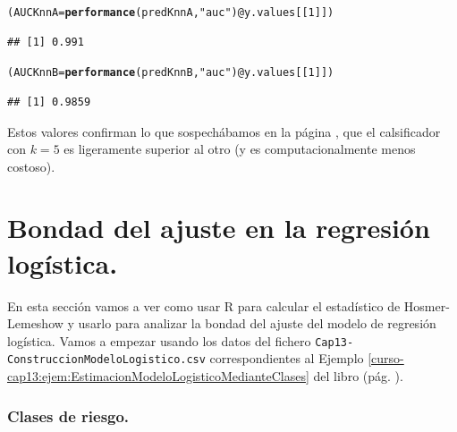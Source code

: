 \documentclass[10pt,a4paper]{article}\usepackage[]{graphicx}\usepackage[]{color}
\makeatletter
\newcommand{\hlnum}[1]{\textcolor[rgb]{0.686,0.059,0.569}{#1}}%
\newcommand{\hlstr}[1]{\textcolor[rgb]{0.192,0.494,0.8}{#1}}%
\newcommand{\hlopt}[1]{\textcolor[rgb]{0,0,0}{#1}}%
\newcommand{\hlstd}[1]{\textcolor[rgb]{0.345,0.345,0.345}{#1}}%
\newcommand{\hlkwb}[1]{\textcolor[rgb]{0.69,0.353,0.396}{#1}}%
\newcommand{\hlkwc}[1]{\textcolor[rgb]{0.333,0.667,0.333}{#1}}%
\newcommand{\hlkwd}[1]{\textcolor[rgb]{0.737,0.353,0.396}{\textbf{#1}}}%
\newenvironment{kframe}{%
 \def\at@end@of@kframe{}%
 \ifinner\ifhmode%
  \def\at@end@of@kframe{\end{minipage}}%
  \begin{minipage}{\columnwidth}%
 \fi\fi%
 \def\FrameCommand##1{\hskip\@totalleftmargin \hskip-\fboxsep
 \colorbox{shadecolor}{##1}\hskip-\fboxsep
     \hskip-\linewidth \hskip-\@totalleftmargin \hskip\columnwidth}%
 \MakeFramed {\advance\hsize-\width
   \@totalleftmargin\z@ \linewidth\hsize
   \@setminipage}}%
 {\par\unskip\endMakeFramed%
 \at@end@of@kframe}
\newenvironment{knitrout}{}{} %
\makeatother
\begin{document}
\begin{knitrout}
\color{fgcolor}\begin{kframe}
\begin{alltt}
\hlstd{(AUCKnnA} \hlkwb{=} \hlkwd{performance}\hlstd{(predKnnA,}\hlstr{"auc"}\hlstd{)}\hlopt{@}\hlkwc{y.values}\hlstd{[[}\hlnum{1}\hlstd{]])}
\end{alltt}
\begin{verbatim}
## [1] 0.991
\end{verbatim}
\begin{alltt}
\hlstd{(AUCKnnB} \hlkwb{=} \hlkwd{performance}\hlstd{(predKnnB,}\hlstr{"auc"}\hlstd{)}\hlopt{@}\hlkwc{y.values}\hlstd{[[}\hlnum{1}\hlstd{]])}
\end{alltt}
\begin{verbatim}
## [1] 0.9859
\end{verbatim}
\end{kframe}
\end{knitrout}

Estos valores confirman lo que sospechábamos en la página \pageref{tut13:subsection:ComaracionClasificadoresCurvasROC}, que el calsificador con $k=5$ es ligeramente superior al otro (y es computacionalmente menos costoso).

\section{Bondad del ajuste en la regresión logística.}
\label{tut13:sec:BondadDelAjuste}

En esta sección vamos a ver como usar R para calcular el estadístico de Hosmer-Lemeshow y usarlo para analizar la bondad del ajuste del modelo de regresión logística. Vamos a empezar  usando los datos del fichero
{\tt Cap13-ConstruccionModeloLogistico.csv} correspondientes al Ejemplo \ref{curso-cap13:ejem:EstimacionModeloLogisticoMedianteClases} del libro (pág. \pageref{curso-cap13:ejem:EstimacionModeloLogisticoMedianteClases}).


\subsubsection*{Clases de riesgo.}
\end{document}
